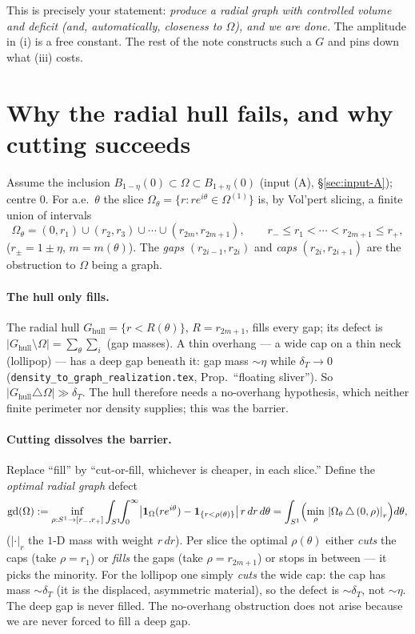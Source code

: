 \documentclass[11pt]{article}
\theoremstyle{definition}
\newcommand{\Om}{\Omega}
\newcommand{\dT}{\delta_T}
\newcommand{\gd}{\mathrm{gd}}
\newcommand{\abs}[1]{\left|#1\right|}
\begin{document}
This is precisely your statement: \emph{produce a radial graph with
controlled volume and deficit \textup{(}and, automatically, closeness to
$\Om$\textup{)}, and we are done.} The amplitude in (i) is a free constant.
The rest of the note constructs such a $G$ and pins down what (iii)
costs.

\section{Why the radial hull fails, and why cutting succeeds}
\label{sec:cutfill}

Assume the inclusion $B_{1-\eta}(0)\subset\Om\subset B_{1+\eta}(0)$
(input (A), \S\ref{sec:input-A}); centre $0$. For a.e.\ $\theta$ the slice
$\Om_\theta=\{r:re^{i\theta}\in\Om^{(1)}\}$ is, by Vol'pert slicing, a
finite union of intervals
\[
   \Om_\theta=(0,r_1)\cup(r_2,r_3)\cup\cdots\cup(r_{2m},r_{2m+1}),
   \qquad r_-\le r_1<\cdots<r_{2m+1}\le r_+,
\]
($r_\pm=1\pm\eta$, $m=m(\theta)$). The \emph{gaps}
$(r_{2i-1},r_{2i})$ and \emph{caps} $(r_{2i},r_{2i+1})$ are the obstruction
to $\Om$ being a graph.

\paragraph{The hull only fills.} The radial hull
$G_{\mathrm{hull}}=\{r<R(\theta)\}$, $R=r_{2m+1}$, fills every gap; its
defect is $\abs{G_{\mathrm{hull}}\setminus\Om}=\sum_\theta\sum_i$ (gap
masses). A thin overhang --- a wide cap on a thin neck (lollipop) --- has a
deep gap beneath it: gap mass $\sim\eta$ while $\dT\to0$
(\texttt{density\_to\_graph\_realization.tex}, Prop.~``floating sliver'').
So $\abs{G_{\mathrm{hull}}\triangle\Om}\gg\dT$. The hull therefore needs a
no-overhang hypothesis, which neither finite perimeter nor density
supplies; this was the barrier.

\paragraph{Cutting dissolves the barrier.} Replace ``fill'' by
``cut-or-fill, whichever is cheaper, in each slice.'' Define the
\emph{optimal radial graph} defect
\begin{equation}\label{eq:gd-def}
   \gd(\Om):=\inf_{\rho:S^1\to[r_-,r_+]}
   \int_{S^1}\!\!\int_0^\infty\bigl|\mathbf 1_\Om(re^{i\theta})
   -\mathbf 1_{\{r<\rho(\theta)\}}\bigr|\,r\,dr\,d\theta
   =\int_{S^1}\Bigl(\min_{\rho}\,\abs{\Om_\theta\,\triangle\,(0,\rho)}_r\Bigr)d\theta,
\end{equation}
($\abs\cdot_r$ the $1$-D mass with weight $r\,dr$). Per slice the optimal
$\rho(\theta)$ either \emph{cuts} the caps (take $\rho=r_1$) or \emph{fills}
the gaps (take $\rho=r_{2m+1}$) or stops in between --- it picks the
minority. For the lollipop one simply \emph{cuts} the wide cap: the cap has
mass $\sim\dT$ (it is the displaced, asymmetric material), so the defect is
$\sim\dT$, not $\sim\eta$. The deep gap is never filled. The no-overhang
obstruction does not arise because we are never forced to fill a deep gap.
\end{document}
